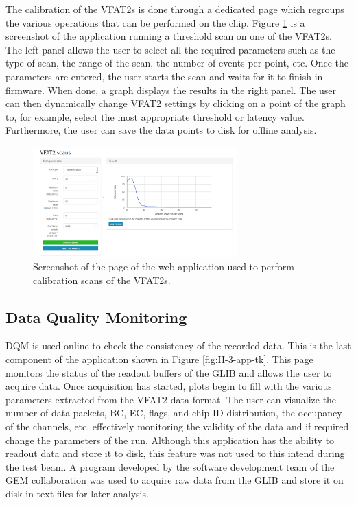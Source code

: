       The calibration of the VFAT2s is done through a dedicated page which regroups the various operations that can be performed on the chip. Figure \ref{fig:II-3-app-calibration} is a screenshot of the application running a threshold scan on one of the VFAT2s. The left panel allows the user to select all the required parameters such as the type of scan, the range of the scan, the number of events per point, etc. Once the parameters are entered, the user starts the scan and waits for it to finish in firmware. When done, a graph displays the results in the right panel. The user can then dynamically change VFAT2 settings by clicking on a point of the graph to, for example, select the most appropriate threshold or latency value. Furthermore, the user can save the data points to disk for offline analysis.

      \begin{figure}[h!]
        \centering
        \includegraphics[width=0.7\textwidth]{img/II-3-test-beam/app-scan.png}
        \caption{Screenshot of the page of the web application used to perform calibration scans of the VFAT2s.}
        \label{fig:II-3-app-calibration}
      \end{figure}

    \subsection{Data Quality Monitoring}

      DQM is used online to check the consistency of the recorded data. This is the last component of the application shown in Figure \ref{fig:II-3-app-tk}. This page monitors the status of the readout buffers of the GLIB and allows the user to acquire data. Once acquisition has started, plots begin to fill with the various parameters extracted from the VFAT2 data format. The user can visualize the number of data packets, BC, EC, flags, and chip ID distribution, the occupancy of the channels, etc, effectively monitoring the validity of the data and if required change the parameters of the run. Although this application has the ability to readout data and store it to disk, this feature was not used to this intend during the test beam. A program developed by the software development team of the GEM collaboration was used to acquire raw data from the GLIB and store it on disk in text files for later analysis.

